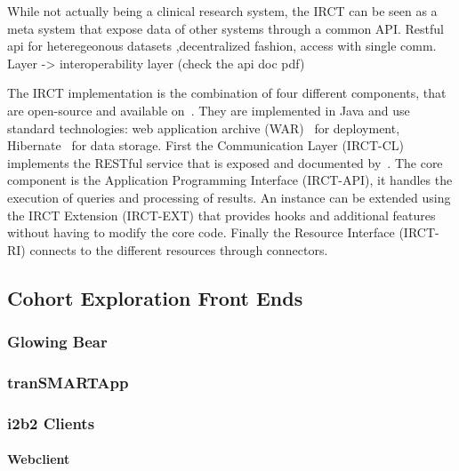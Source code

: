 While not actually being a clinical research system, the IRCT can be seen as a meta system that expose data of other systems through a common API.
Restful api for heteregeonous datasets ,decentralized fashion, access with single comm. Layer -> interoperability layer (check the api doc pdf)

The IRCT implementation is the combination of four different components, that are open-source and available on~\cite{IRCT-github}. They are implemented in Java and use standard technologies: web application archive (WAR)~\cite{wiki:war} for deployment, Hibernate~\cite{wiki:hibernate} for data storage.
First the Communication Layer (IRCT-CL) implements the RESTful service that is exposed and documented by~\cite{PIC-SURE-API}. 
The core component is the Application Programming Interface (IRCT-API), it handles the execution of queries and processing of results.
An instance can be extended using the IRCT Extension (IRCT-EXT) that provides hooks and additional features without having to modify the core code.
Finally the Resource Interface (IRCT-RI) connects to the different resources through connectors.





\subsection{Cohort Exploration Front Ends}
\subsubsection{Glowing Bear}

\subsubsection{tranSMARTApp}


\subsubsection{i2b2 Clients}
\paragraph{Webclient}

